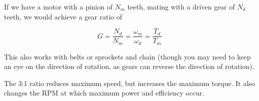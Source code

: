 \documentclass[10pt,letterpaper]{book}
\begin{document}
If we have a motor with a pinion of $N_m$ teeth, mating with a driven gear of $N_d$ teeth, we would achieve a gear ratio of

\begin{equation}
  G = \frac{N_d}{N_m} = \frac{\omega_m}{\omega_d} = \frac{T_d}{T_m}
\end{equation}

This also works with belts or sprockets and chain (though you may need to keep an eye on the direction of rotation, as gears can reverse the direction of rotation).



The 3:1 ratio reduces maximum speed, but increases the maximum torque.
It also changes the RPM at which maximum power and efficiency occur.
\end{document}

